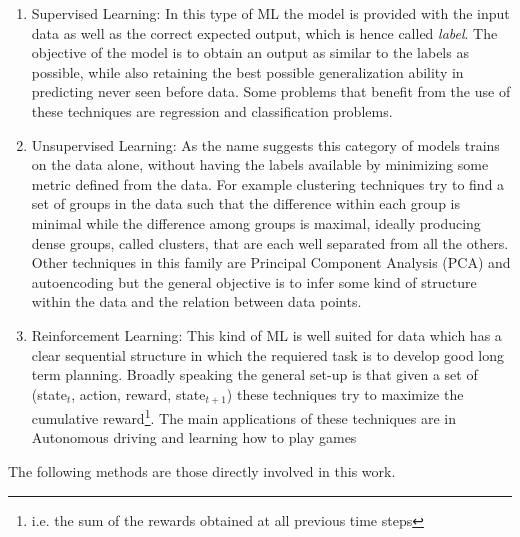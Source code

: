 \begin{enumerate}
\item Supervised Learning: In this type of ML the model is provided with the input data as well as the correct expected output, which is hence called \textit{label}. The objective of the model is to obtain an output as similar to the labels as possible, while also retaining the best possible generalization ability in predicting never seen before data. Some problems that benefit from the use of these techniques are regression and classification problems.
\item Unsupervised Learning: As the name suggests this category of models trains on the data alone, without having the labels available by minimizing some metric defined from the data. For example clustering techniques try to find a set of groups in the data such that the difference within each group is minimal while the difference among groups is maximal, ideally producing dense groups, called clusters, that are each well separated from all the others. Other techniques in this family are Principal Component Analysis (PCA) and autoencoding but the general objective is to infer some kind of structure within the data and the relation between data points.
\item Reinforcement Learning:  This kind of ML is well suited for data which has a clear sequential structure in which the requiered task is to develop good long term planning. Broadly speaking the general set-up is that given a set of (state$_{t}$, action, reward, state$_{t+1}$) these techniques try to maximize the cumulative reward\footnote{i.e. the sum of the rewards obtained at all previous time steps}. The main applications of these techniques are in Autonomous driving and learning how to play games
\end{enumerate}

The following methods are those directly involved in this work.

